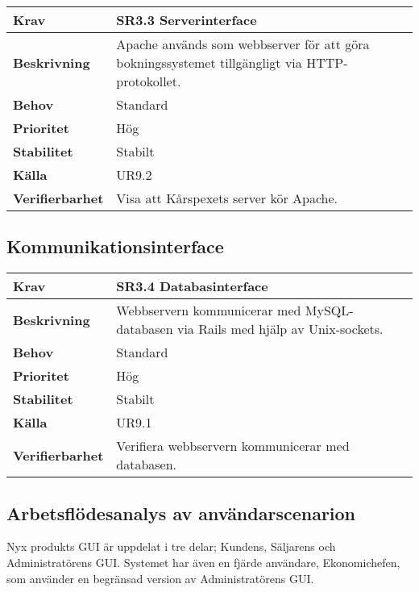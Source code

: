 \documentclass[a4paper, twoside, 11pt, titlepage]{article}
\begin{document}
		\begin{tabular} { p{2.6cm} p{12.5cm} }
			\hline
			\sffamily\textbf{Krav} & \sffamily\textbf{SR3.3 Serverinterface } \\
			\hline
			\sffamily\textbf{Beskrivning} & Apache används som webbserver för att göra bokningssystemet tillgängligt via HTTP-protokollet.  \\
			\hline
			\sffamily\textbf{Behov} & Standard  \\
			\hline
			\sffamily\textbf{Prioritet} & Hög  \\
			\hline
			\sffamily\textbf{Stabilitet} & Stabilt  \\
			\hline
			\sffamily\textbf{Källa} & UR9.2  \\
			\hline
			\sffamily\textbf{Verifierbarhet} & Visa att Kårspexets server kör Apache.  \\
			\hline
		\end{tabular}


	\subsection{Kommunikationsinterface}


	\begin{tabular} { p{2.6cm} p{12.5cm} }
		\hline
		\sffamily\textbf{Krav} & \sffamily\textbf{SR3.4 Databasinterface } \\
		\hline
		\sffamily\textbf{Beskrivning} & Webbservern kommunicerar med MySQL-databasen via Rails med hjälp av Unix-sockets.  \\
		\hline
		\sffamily\textbf{Behov} & Standard  \\
		\hline
		\sffamily\textbf{Prioritet} & Hög  \\
		\hline
		\sffamily\textbf{Stabilitet} & Stabilt  \\
		\hline
		\sffamily\textbf{Källa} & UR9.1  \\
		\hline
		\sffamily\textbf{Verifierbarhet} & Verifiera webbservern kommunicerar med databasen.  \\
		\hline
	\end{tabular}


	\subsection{Arbetsflödesanalys av användarscenarion}


	Nyx produkts GUI är uppdelat i tre delar; Kundens, Säljarens och Administratörens GUI. Systemet har även en fjärde användare, Ekonomichefen, som använder en begränsad version av Administratörens GUI.
\end{document}
